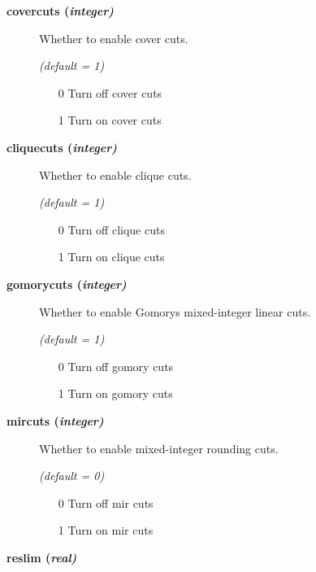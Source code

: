 \begin{description}
\item[\label{glpkcovercuts}\hypertarget{glpkcovercuts}
{\textbf{covercuts (\slshape{integer})}}]\hspace{1.0in}

Whether to enable cover cuts.

\textsl{(default = 1)}
\begin{itemize}
\item[0] 
Turn off cover cuts
\item[1] 
Turn on cover cuts
\end{itemize}

\item[\label{glpkcliquecuts}\hypertarget{glpkcliquecuts}
{\textbf{cliquecuts (\slshape{integer})}}]\hspace{1.0in}

Whether to enable clique cuts.

\textsl{(default = 1)}
\begin{itemize}
\item[0] 
Turn off clique cuts
\item[1] 
Turn on clique cuts
\end{itemize}

\item[\label{glpkgomorycuts}\hypertarget{glpkgomorycuts}
{\textbf{gomorycuts (\slshape{integer})}}]\hspace{1.0in}

Whether to enable Gomorys mixed-integer linear cuts.

\textsl{(default = 1)}
\begin{itemize}
\item[0] 
Turn off gomory cuts
\item[1] 
Turn on gomory cuts
\end{itemize}

\item[\label{glpkmircuts}\hypertarget{glpkmircuts}
{\textbf{mircuts (\slshape{integer})}}]\hspace{1.0in}

Whether to enable mixed-integer rounding cuts.

\textsl{(default = 0)}
\begin{itemize}
\item[0] 
Turn off mir cuts
\item[1] 
Turn on mir cuts
\end{itemize}

\item[\label{glpkreslim}\hypertarget{glpkreslim}
{\textbf{reslim (\slshape{real})}}]\hspace{1.0in}


\end{description}
